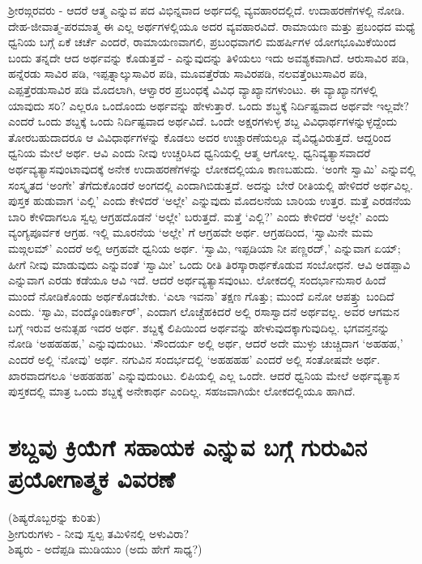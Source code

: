 ಶ್ರೀರಙ್ಗರವರು - ಆದರೆ ಆತ್ಮ ಎನ್ನುವ ಪದ ವಿಭಿನ್ನವಾದ ಅರ್ಥದಲ್ಲಿ ವ್ಯವಹಾರದಲ್ಲಿದೆ. ಉದಾಹರಣೆಗಳಲ್ಲಿ ನೋಡಿ. ದೇಹ-ಜೀವಾತ್ಮ-ಪರಮಾತ್ಮ ಈ ಎಲ್ಲ ಅರ್ಥಗಳಲ್ಲಿಯೂ ಅದರ ವ್ಯವಹಾರವಿದೆ. ರಾಮಾಯಣ ಮತ್ತು ಪ್ರಬಂಧದ ಮಧ್ಯೆ ಧ್ವನಿಯ ಬಗ್ಗೆ ಏಕೆ ಚರ್ಚೆ ಎಂದರೆ, ರಾಮಾಯಣವಾಗಲಿ, ಪ್ರಬಂಧವಾಗಲಿ ಮಹರ್ಷಿಗಳ ಯೋಗಭೂಮಿಕೆಯಿಂದ ಬಂದು ತನ್ನದೇ ಆದ ಅರ್ಥವನ್ನು ಕೊಡುತ್ತವೆ - ಎನ್ನುವುದನ್ನು ತಿಳಿಯಲು ಇದು ಅವಶ್ಯಕವಾಗಿದೆ. ಆರುಸಾವಿರ ಪಡಿ, ಹನ್ನೆರಡು ಸಾವಿರ ಪಡಿ, ಇಪ್ಪತ್ನಾಲ್ಕುಸಾವಿರ ಪಡಿ, ಮೂವತ್ತೆರೆಡು ಸಾವಿರಪಡಿ, ನಲವತ್ತೆಂಟುಸಾವಿರ ಪಡಿ, ಎಪ್ಪತ್ತೆರಡುಸಾವಿರ ಪಡಿ ಮೊದಲಾಗಿ, ಆಳ್ವಾರರ ಪ್ರಬಂಧಕ್ಕೆ ವಿವಿಧ ವ್ಯಾಖ್ಯಾನಗಳುಂಟು. ಈ ವ್ಯಾಖ್ಯಾನಗಳಲ್ಲಿ ಯಾವುದು ಸರಿ? ಎಲ್ಲರೂ ಒಂದೊಂದು ಅರ್ಥವನ್ನು ಹೇಳುತ್ತಾರೆ. ಒಂದು ಶಬ್ಧಕ್ಕೆ ನಿರ್ದಿಷ್ಟವಾದ ಅರ್ಥವೇ ಇಲ್ಲವೇ? ಎಂದರೆ ಒಂದು ಶಬ್ದಕ್ಕೆ ಒಂದು ನಿರ್ದಿಷ್ಟವಾದ ಅರ್ಥವಿದೆ. ಒಂದೇ ಅಕ್ಷರಗಳುಳ್ಳ ಶಬ್ದ ವಿವಿಧಾರ್ಥಗಳನ್ನುಳ್ಳದ್ದೆಂದು ತೋರಬಹುದಾದರೂ ಆ ವಿವಿಧಾರ್ಥಗಳನ್ನು ಕೊಡಲು ಅದರ ಉಚ್ಚಾರಣೆಯಲ್ಲೂ ವೈವಿಧ್ಯವಿರುತ್ತದೆ. ಆದ್ದರಿಂದ ಧ್ವನಿಯ ಮೇಲೆ ಅರ್ಥ. ಆವಿ ಎಂದು ನೀವು ಉಚ್ಚರಿಸಿದ ಧ್ವನಿಯಲ್ಲಿ ಆತ್ಮ ಆಗೋಲ್ಲ. ಧ್ವನಿವ್ಯತ್ಯಾಸವಾದರೆ ಅರ್ಥವ್ಯತ್ಯಾಸವುಂಟಾವುದಕ್ಕೆ ಅನೇಕ ಉದಾಹರಣೆಗಳನ್ನು ಲೋಕದಲ್ಲಿಯೂ ಕಾಣಬಹುದು. `ಅಂಗೇ ಸ್ವಾಮಿ' ಎನ್ನುವಲ್ಲಿ ಸಂಸ್ಕೃತದ `ಅಂಗೇ' ತೆಗೆದುಕೊಂಡರೆ ಅಂಗದಲ್ಲಿ ಎಂದಾಗಿಬಿಡುತ್ತದೆ. ಅದನ್ನು ಬೇರೆ ರೀತಿಯಲ್ಲಿ ಹೇಳಿದರೆ ಅರ್ಥವಿಲ್ಲ. ಪುಸ್ತಕ ಹುಡುವಾಗ `ಎಲ್ಲಿ' ಎಂದು ಕೇಳಿದರೆ `ಅಲ್ಲೇ' ಎನ್ನುವುದು ಮೊದಲನೆಯ ಬಾರಿಯ ಉತ್ತರ. ಮತ್ತೆ ಎರಡನೆಯ ಬಾರಿ ಕೇಳಿದಾಗಲೂ ಸ್ವಲ್ಪ ಆಗ್ರಹದೊಡನೆ `ಅಲ್ಲೇ' ಬರುತ್ತದೆ. ಮತ್ತೆ `ಎಲ್ಲಿ?' ಎಂದು ಕೇಳಿದರೆ `ಅಲ್ಲೇ' ಎಂದು ವ್ಯಂಗ್ಯಪೂರ್ವಕ ಆಗ್ರಹ. ಇಲ್ಲಿ ಮೂರನೆಯ `ಅಲ್ಲೇ' ಗೆ ಆಗ್ರಹವೇ ಅರ್ಥ. ಆಗ್ರಹದಿಂದ, `ಸ್ವಾಮಿನೇ ಮಮ ಮಙ್ಗಲಮ್' ಎಂದರೆ ಅಲ್ಲಿ ಆಗ್ರಹವೇ ಧ್ವನಿಯ ಅರ್ಥ. `ಸ್ವಾಮಿ, ಇಪ್ಪಡಿಯಾ ನೀ ಪಣ್ಣರದ್,' ಎನ್ನುವಾಗ ಏಯ್; ಹೀಗೆ ನೀವು ಮಾಡುವುದು ಎನ್ನುವಂತೆ `ಸ್ವಾಮೀ' ಒಂದು ರೀತಿ ತಿರಸ್ಕಾರಾರ್ಥಕೊಡುವ ಸಂಬೋಧನೆ. ಆವಿ ಅಡಪ್ಪಾವಿ ಎನ್ನುವಾಗ ಎರಡು ಕಡೆಯೂ ಆವಿ ಇದೆ. ಆದರೆ ಅರ್ಥವ್ಯತ್ಯಾಸವುಂಟು. ಲೋಕದಲ್ಲಿ ಸಂದರ್ಭಾನುಸಾರ ಹಿಂದೆ ಮುಂದೆ ನೋಡಿಕೊಂಡು ಅರ್ಥಕೊಡಬೇಕು. `ಎಲಾ ಇವನಾ' ತಕ್ಷಣ ಗೊತ್ತು; ಮುಂದೆ ಏನೋ ಆಪತ್ತ್ತು ಬಂದಿದೆ ಎಂದು. `ಸ್ವಾಮಿ, ವಂದ್ಕೊಂಡಿರ್ಕಾರ್', ಎಂದಾಗ ಲೊಚ್ಚೆಹಕಿದರೆ ಅಲ್ಲಿ ರಸಾಸ್ವಾದನೆ ಅರ್ಥವಲ್ಲ. ಅವರ ಆಗಮನ ಬಗ್ಗೆ ಇರುವ ಅನುತ್ಸಹ ಇದರ ಅರ್ಥ. ಶಬ್ದಕ್ಕೆ ಲಿಪಿಯಿಂದ ಅರ್ಥವನ್ನು ಹೇಳುವುದಕ್ಕಾಗುವುದಿಲ್ಲ. ಭಗವನ್ತನನ್ನು ನೋಡಿ `ಅಹಹಹಹ,' ಎನ್ನುವುದುಂಟು. `ಸೌಂದರ್ಯ ಅಲ್ಲಿ ಅರ್ಥ, ಆದರೆ ಅದೇ ಮುಳ್ಳು  ಚುಚ್ಚಿದಾಗ `ಅಹಹಹ,' ಎಂದರೆ ಅಲ್ಲಿ `ನೋವು' ಅರ್ಥ. ನಗುವಿನ ಸಂದರ್ಭದಲ್ಲಿ `ಅಹಹಹಹ' ಎಂದರೆ ಅಲ್ಲಿ ಸಂತೋಷವೇ ಅರ್ಥ. ಖಾರವಾದಗಲೂ `ಅಹಹಹಹ' ಎನ್ನುವುದುಂಟು. ಲಿಪಿಯಲ್ಲಿ ಎಲ್ಲ ಒಂದೇ. ಆದರೆ ಧ್ವನಿಯ ಮೇಲೆ ಅರ್ಥವ್ಯತ್ಯಾಸ ಪುಸ್ತಕದಲ್ಲಿ ಮಾತ್ರ ಒಂದು ಶಬ್ದಕ್ಕೆ ಅನೇಕಾರ್ಥ ಎಂದಿಲ್ಲ. ಸಹಜವಾಗಿಯೇ ಲೋಕದಲ್ಲಿಯೂ ಹಾಗಿದೆ. 

\section*{ಶಬ್ದವು ಕ್ರಿಯೆಗೆ ಸಹಾಯಕ ಎನ್ನುವ ಬಗ್ಗೆ ಗುರುವಿನ ಪ್ರಯೋಗಾತ್ಮಕ ವಿವರಣೆ}

(ಶಿಷ್ಯರೊಬ್ಬರನ್ನು ಕುರಿತು)\\
ಶ್ರೀಗುರುಗಳು - ನೀವು ಸ್ವಲ್ಪ ತಮಿಳಿನಲ್ಲಿ ಅಳುವಿರಾ?\\
ಶಿಷ್ಯರು - ಅದೆಪ್ಪಡಿ ಮುಡಿಯುಂ (ಅದು ಹೇಗೆ ಸಾಧ್ಯ?)\\

